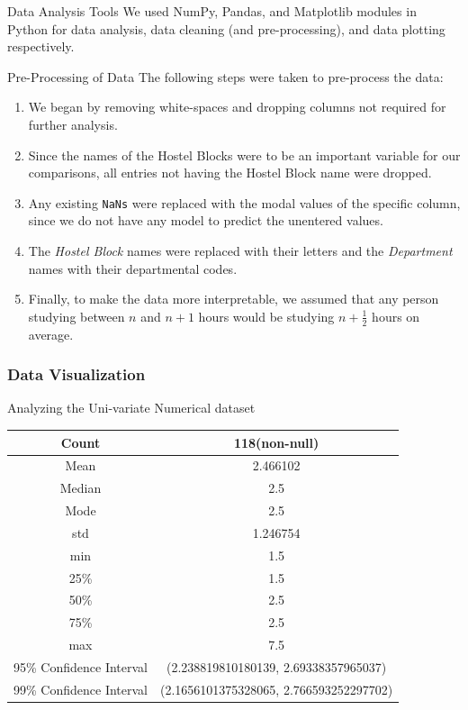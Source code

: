 \documentclass{beamer}
\begin{document}
\begin{frame}
\begin{block}{Data Analysis Tools}
We used NumPy, Pandas, and Matplotlib modules in Python for data analysis, data cleaning (and pre-processing), and data plotting respectively.
\end{block}
\end{frame}

\begin{frame}
\begin{block}{Pre-Processing of Data}
The following steps were taken to pre-process the data:
\begin{enumerate}
    \item We began by removing white-spaces and dropping columns not required for further analysis.
    \item Since the names of the Hostel Blocks were to be an important variable for our comparisons, all entries not having the Hostel Block name were dropped.
    \item Any existing \texttt{NaNs} were replaced with the modal values of the specific column, since we do not have any model to predict the unentered values.
    \item The \textit{Hostel Block} names were replaced with their letters and the \textit{Department} names with their departmental codes.
    \item Finally, to make the data more interpretable, we assumed that any person studying between $n$ and $n+1$ hours would be studying $n + \frac{1}{2}$ hours on average.
\end{enumerate}
\end{block}
    
\end{frame}

\begin{frame}
\frametitle{Data Visualization}
\begin{block}{Analyzing the Uni-variate Numerical dataset}
\begin{center}
\begin{tabular}{|c|c|}
\hline 
Count & 118(non-null) \\ 
\hline 
Mean & 2.466102 \\ 
\hline 
Median & 2.5 \\ 
\hline 
Mode & 2.5 \\ 
\hline 
std & 1.246754 \\ 
\hline 
min & 1.5 \\ 
\hline 
25\% & 1.5 \\ 
\hline 
50\% & 2.5 \\ 
\hline 
75\% & 2.5 \\ 
\hline 
max & 7.5 \\ 
\hline
95\% Confidence Interval & (2.238819810180139, 2.69338357965037) \\ 
\hline
99\% Confidence Interval & (2.1656101375328065, 2.766593252297702) \\ 
\hline
\end{tabular} 
\end{center}
\end{block}
\end{frame}
\end{document}
